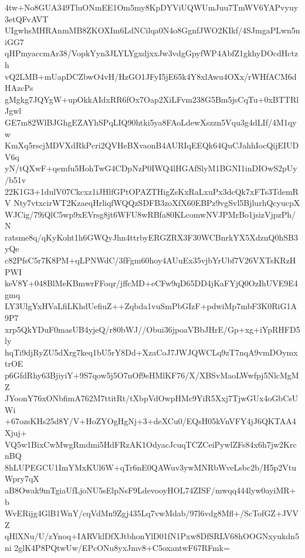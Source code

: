 4tw+No8GUA349TluONmEE1Om5my8KpDYViUQWUmJuu7TmWV6YAPvyuy3etQFvAVT
UIgwhsMHRAnmMB8ZKOXIm6LdNCilqa0N4o8GgnfJWO2KIkf/4SJmgaPLwn5niGG7
qHPmyaccmAr38/VopkYyn3JLYLYgxdjxxJw3vdgGpyfWP4AbfZ1gkhyDOcdHctzh
vQ2LMB+mUapDCZbwO4vH/HzGO1JFyI5jE65k4Y8xlAwu4OXx/rWHfACM6dHAzcPs
gMgkg7JQYgW+upOkkAIdxRR6fOx7Oap2XiLFvm238G5Bm5jsCqTu+0xBTTRlJgwl
GE7m82WlBJGhgEZAYhSPqLIQ90htki5ya8FAoLdewXszzn5Vqu3g4dLIf/4M1qyw
KmXq5rscjMDVXdRkPcri2QVHeBXvaonB4AURIqEEQk64QuCJahhIocQijEIUDV6q
yN/tQXwF+qemfu5HohTwG4CDpNzP0IWQ4lHGAfSlyM1BGNI1inDIOwS2pUy/b51v
22K1G3+1dulV07Ckcxz1iJHlfGPtOPAZTHigZsKxRaLxuPx3dcQk7xFTs3TdemRV
Nty7vtxcirWT2KzaeqHrliqfWQQzSDFB3zoXfX60EBPz9vgSvl5BjlurhQcyucpX
WJCig/79iQlC5wp9xEVrsg8jt6WFU8wRBfa80KLcomwNVJPMrBo1jsizVjpzPh/N
ratsme8q/qKyKoht1h6GWQyJhn4ttrbyERGZRX3F30WCBnrkYX5XdznQ0hSB3yQe
c82PfsC5r7K8PM+qLPNWdC/3fFgm60hoy4AUuEx35vjbYrUbf7V26VXTsKRzHPWI
keV8Y+048BlMeKBmwrFFoqr/jffcMD+eCFw9qD65DD4jKaFYjQ0OzIhUVE9E4gmq
LY3UlgYxHVaLfiLKhdUefiuZ++Zqbda1vuSmPbGIzF+pdwiMp7mbF3K0RiG1A9P7
xrp5QkYDuF0masUB4yjeQ/r80bWJ//Obui36jpoaVBbJHrE/Gp+xg+iYpRHFD5ly
hqTi9djRyZU5dXrg7keq1bU5rY8Dd+XzaCoJ7JWJQWCLq9zT7nqA9vmDOymxtrOE
p6GfdRhy63BjiyiY+9S7qow5j5O7nOf9eHMlKF76/X/XBSvMaoLWwfpj5NlcMgMZ
JYoonY76xONbfimA762M7ttitRt/tXbpVdOwpHMc9YiR5Xxj7TjwGUx4oGbCsUWi
+67ozsKHs25d8Y/V+HoZYOgHgNj+3+deXCu0/EQsH05kVnVFY4jJ6QKTAA4Xjuj+
VQ5w1BixCwMwgRmdmi5HdFRzAK1OdyacJcuqTCZCeiPywlZFs84x6h7jw2KrcnBQ
8hLUPEGCU1ImYMxKUl6W+qTr6nE0QAWuv3ywMNRbWveLsbc2b/H5p2VtuWpry7qX
aB8Owak9mTgiaUfLjoNU5sElpNsF9LdevooyHOL74ZISF/mwqq444lyw0ayiMR+b
WvERijg4GlB1WnY/cqVdMn9Zgj435Lq7vwMdab/97l6vdg8Mfl+/ScTofGZ+JVVZ
qHlXNu/U/zYnoq+IARVklDfXJtbhonYlD01fN1Pxw8DfSRLV68hOOGNxyukdn5ni
2glK4P8PQtwUw/EPcONu8yxJmv8+C5oxantwF67RFmk=
